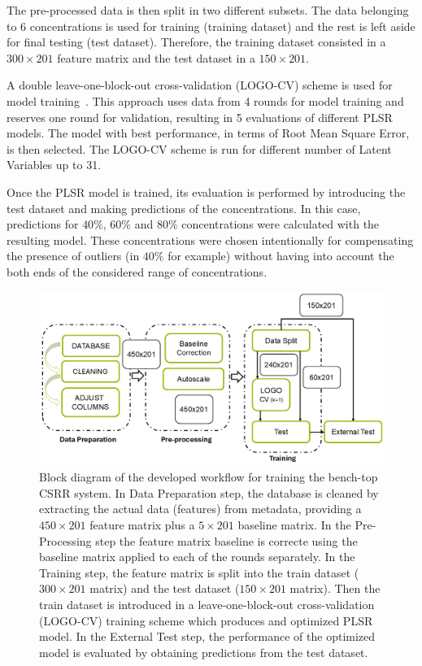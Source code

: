 \documentclass[journal,twoside,web]{ieeecolor}
\begin{document}
The pre-processed data is then split in two different subsets. The data belonging to $6$ concentrations is used for training (training dataset) and the rest is left aside for final testing (test dataset). Therefore, the training dataset consisted in a $300\times201$ feature matrix and the test dataset in a $150\times201$. 

A double leave-one-block-out cross-validation (LOGO-CV) scheme is used for model training~\cite{Filzmoser2009}. This approach uses data from 4 rounds for model training and reserves one round for validation, resulting in 5 evaluations of different PLSR models. The model with best performance, in terms of Root Mean Square Error, is then selected. The LOGO-CV scheme is run for different number of Latent Variables up to 31. 

Once the PLSR model is trained, its evaluation is performed by introducing the test dataset and making predictions of the concentrations. In this case, predictions for $40\%$, $60\%$ and $80\%$ concentrations were calculated with the resulting model. These concentrations were chosen intentionally for compensating the presence of outliers (in $40\%$ for example) without having into account the both ends of the considered range of concentrations.

\begin{figure}[!t]
	\centering
	\includegraphics [trim = 0mm 0mm 0mm 0mm, clip, width=1\columnwidth]{figures/fig6_2.png}
	\caption{Block diagram of the developed workflow for training the bench-top CSRR system. In Data Preparation step, the database is cleaned by extracting the actual data (features) from metadata, providing a $450\times201$ feature matrix plus a $5\times201$ baseline matrix. In the Pre-Processing step the feature matrix baseline is correcte using the baseline matrix applied to each of the rounds separately. In the Training step, the feature matrix is split into the train dataset ($300\times201$ matrix) and the test dataset ($150\times201$ matrix). Then the train dataset is introduced in a leave-one-block-out cross-validation (LOGO-CV) training scheme which produces and optimized PLSR model. In the External Test step, the performance of the optimized model is evaluated by obtaining predictions from the test dataset.}
	\label{fig:workflow}
	\vspace{-0.3cm}
\end{figure}
\end{document}
